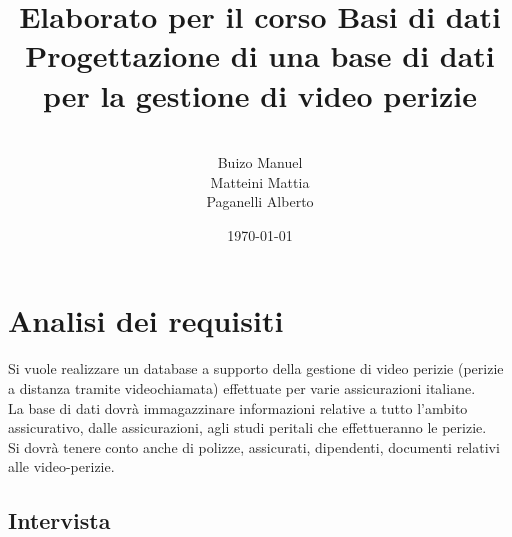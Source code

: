 \documentclass[a4paper,12pt]{report}
\title{\textbf{Elaborato per il corso Basi di dati}
Progettazione di una base di dati per la gestione di video perizie}
\author{
\\Buizo Manuel
\\Matteini Mattia
\\Paganelli Alberto
}
\date{\today}
\begin{document}
\maketitle

\tableofcontents

\chapter{Analisi dei requisiti}

Si vuole realizzare un database a supporto della gestione di video perizie (perizie a distanza tramite videochiamata) effettuate per varie assicurazioni italiane.
\\
La base di dati dovrà immagazzinare informazioni relative a tutto l’ambito assicurativo, dalle assicurazioni, agli studi peritali che effettueranno le perizie.
\\
Si dovrà tenere conto anche di polizze, assicurati, dipendenti, documenti relativi alle video-perizie.


\section{Intervista}
\end{document}
